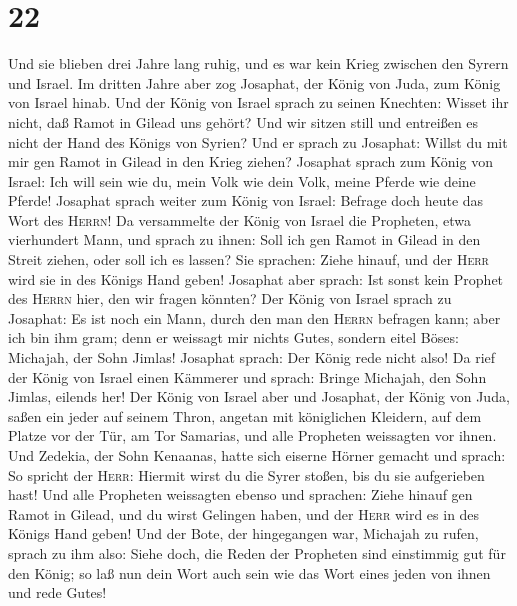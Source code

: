 \hypertarget{section-21}{%
\section{22}\label{section-21}}

 Und sie blieben drei Jahre lang ruhig, und es war kein
Krieg zwischen den Syrern und Israel.  Im dritten Jahre
aber zog Josaphat, der König von Juda, zum König von Israel hinab.
 Und der König von Israel sprach zu seinen Knechten:
Wisset ihr nicht, daß Ramot in Gilead uns gehört? Und wir sitzen still
und entreißen es nicht der Hand des Königs von Syrien? 
Und er sprach zu Josaphat: Willst du mit mir gen Ramot in Gilead in den
Krieg ziehen? Josaphat sprach zum König von Israel: Ich will sein wie
du, mein Volk wie dein Volk, meine Pferde wie deine Pferde!
 Josaphat sprach weiter zum König von Israel: Befrage doch
heute das Wort des \textsc{Herrn}!  Da versammelte der
König von Israel die Propheten, etwa vierhundert Mann, und sprach zu
ihnen: Soll ich gen Ramot in Gilead in den Streit ziehen, oder soll ich
es lassen? Sie sprachen: Ziehe hinauf, und der \textsc{Herr} wird sie in
des Königs Hand geben!  Josaphat aber sprach: Ist sonst
kein Prophet des \textsc{Herrn} hier, den wir fragen könnten?
 Der König von Israel sprach zu Josaphat: Es ist noch ein
Mann, durch den man den \textsc{Herrn} befragen kann; aber ich bin ihm
gram; denn er weissagt mir nichts Gutes, sondern eitel Böses: Michajah,
der Sohn Jimlas! Josaphat sprach: Der König rede nicht also!
 Da rief der König von Israel einen Kämmerer und sprach:
Bringe Michajah, den Sohn Jimlas, eilends her!  Der König
von Israel aber und Josaphat, der König von Juda, saßen ein jeder auf
seinem Thron, angetan mit königlichen Kleidern, auf dem Platze vor der
Tür, am Tor Samarias, und alle Propheten weissagten vor ihnen.
 Und Zedekia, der Sohn Kenaanas, hatte sich eiserne
Hörner gemacht und sprach: So spricht der \textsc{Herr}: Hiermit wirst
du die Syrer stoßen, bis du sie aufgerieben hast!  Und
alle Propheten weissagten ebenso und sprachen: Ziehe hinauf gen Ramot in
Gilead, und du wirst Gelingen haben, und der \textsc{Herr} wird es in
des Königs Hand geben!  Und der Bote, der hingegangen
war, Michajah zu rufen, sprach zu ihm also: Siehe doch, die Reden der
Propheten sind einstimmig gut für den König; so laß nun dein Wort auch
sein wie das Wort eines jeden von ihnen und rede Gutes! 

